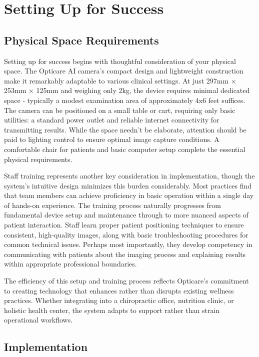 \documentclass[
  Letterpaper,
]{scrbook}
\begin{document}
\section{Setting Up for Success}\label{setting-up-for-success}

\subsection{Physical Space
Requirements}\label{physical-space-requirements}

Setting up for success begins with thoughtful consideration of your
physical space. The Opticare AI camera's compact design and lightweight
construction make it remarkably adaptable to various clinical settings.
At just 297mm × 253mm × 125mm and weighing only 2kg, the device requires
minimal dedicated space - typically a modest examination area of
approximately 4x6 feet suffices. The camera can be positioned on a small
table or cart, requiring only basic utilities: a standard power outlet
and reliable internet connectivity for transmitting results. While the
space needn't be elaborate, attention should be paid to lighting control
to ensure optimal image capture conditions. A comfortable chair for
patients and basic computer setup complete the essential physical
requirements.

Staff training represents another key consideration in implementation,
though the system's intuitive design minimizes this burden considerably.
Most practices find that team members can achieve proficiency in basic
operation within a single day of hands-on experience. The training
process naturally progresses from fundamental device setup and
maintenance through to more nuanced aspects of patient interaction.
Staff learn proper patient positioning techniques to ensure consistent,
high-quality images, along with basic troubleshooting procedures for
common technical issues. Perhaps most importantly, they develop
competency in communicating with patients about the imaging process and
explaining results within appropriate professional boundaries.

The efficiency of this setup and training process reflects Opticare's
commitment to creating technology that enhances rather than disrupts
existing wellness practices. Whether integrating into a chiropractic
office, nutrition clinic, or holistic health center, the system adapts
to support rather than strain operational workflows.

\subsection{Implementation}\label{implementation}
\end{document}
